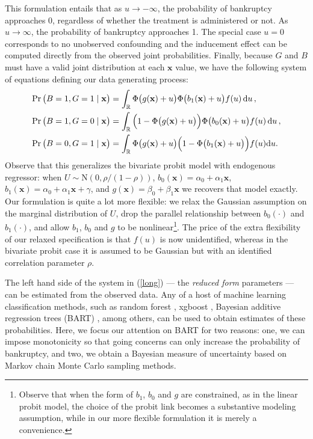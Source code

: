 \documentclass[aoas,preprint, 11pt, dvipsnames, table, x11name]{imsart}
\renewcommand{\bm}[1]{\mathbf{#1}}
\theoremstyle{remark}
\begin{document}
	This formulation entails that as $u\rightarrow -\infty$, the probability of bankruptcy approaches 0, regardless of whether the treatment is administered or not. As $u\rightarrow \infty$, the probability of bankruptcy approaches 1.  The special case $u=0$ corresponds to no unobserved confounding and the inducement effect can be computed directly from the observed joint probabilities.      	
	Finally, because $G$ and $B$ must have a valid joint distribution at each $\mathbf{x}$ value, we have the following system of equations defining our data generating process:
	\begin{equation}
		\begin{split}
			\Pr\qty(B=1, G=1\mid \bm{x})&= \int_{\mathbb{R}} \Phi\qty(g(\bm{x})+u)\Phi\qty(b_1(\bm{x})+u)f(u)\dd{u},\\
			\Pr\qty(B=1, G=0\mid \bm{x})&=\int_{\mathbb{R}} \qty(1-\Phi\qty(g(\bm{x})+u))\Phi\qty(b_0(\bm{x})+u)f(u)\dd{u},\\
			\Pr\qty(B=0, G=1\mid \bm{x})&=\int_{\mathbb{R}}\Phi\qty(g(\bm{x})+u)\qty(1-\Phi\qty(b_1(\bm{x})+u))f(u)\dd u.
			\label{long}
		\end{split}
	\end{equation}
	Observe that this generalizes the bivariate probit model with endogenous regressor: when $U \sim \mbox{N}(0, \rho/(1-\rho))$,  $b_0(\mathbf{x}) = \alpha_0 + \alpha_1 \mathbf{x}$, $b_1(\mathbf{x}) = \alpha_0 + \alpha_1 \mathbf{x} + \gamma$, and $g(\mathbf{x}) = \beta_0 + \beta_1 \mathbf{x}$ we recovers that model exactly.	Our formulation is quite a lot more flexible: we relax the Gaussian assumption on the marginal distribution of $U$, drop the parallel relationship between $b_0(\cdot)$ and $b_1(\cdot)$, and allow $b_1$, $b_0$ and $g$ to be nonlinear\footnote{Observe that when the form of $b_1$, $b_0$ and $g$ are constrained, as in the linear probit model, the choice of the probit link becomes a substantive modeling assumption, while in our more flexible formulation it is merely a convenience.}. The price of the extra flexibility of our relaxed specification is that $f(u)$ is now unidentified, whereas in the bivariate probit case it is assumed to be Gaussian but with an identified correlation parameter $\rho$. 
	
	The left hand side of the system in (\ref{long}) --- the {\em reduced form} parameters --- can be estimated from the observed data.  Any of a host of machine learning classification methods, such as random forest \citep{rf}, xgboost \citep{boost}, Bayesian additive regression trees (BART) \citep{bart}, among others, can be used to obtain estimates of these probabilities. Here, we focus our attention on BART for two reasons: one, we can impose monotonicity so that going concerns can only increase the probability of bankruptcy, and two, we obtain a Bayesian measure of uncertainty based on Markov chain Monte Carlo sampling methods. %
	
\end{document}

